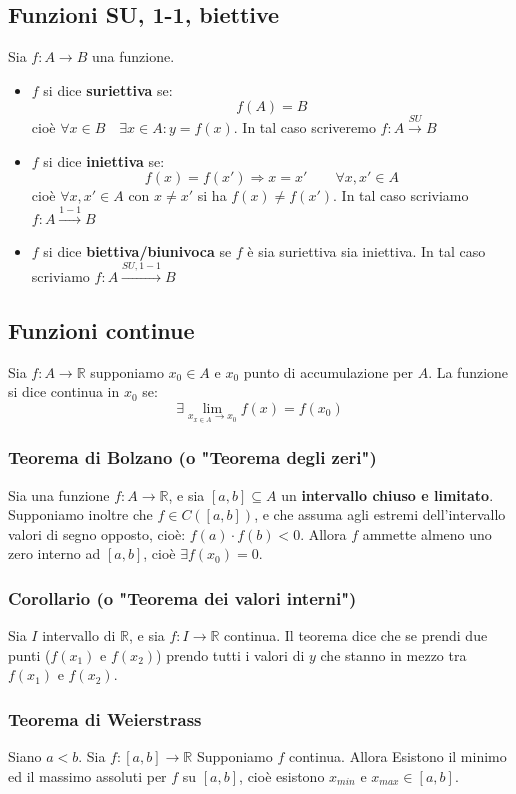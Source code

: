 \subsection{Funzioni SU, 1-1, biettive}
Sia $f:A\to B$ una funzione.
\begin{itemize}
    \item $f$ si dice \textbf{suriettiva} se:
    \begin{equation}
        f(A) = B
    \end{equation}
    cioè $\forall x\in B \quad \exists x\in A : y = f(x)$. In tal caso scriveremo $f:A\xrightarrow{SU} B$

    \item $f$ si dice \textbf{iniettiva} se:
    \begin{equation}
        f(x) = f(x') \Longrightarrow x = x' \qquad \forall x, x' \in A
    \end{equation}
    cioè $\forall x, x' \in A$ con $x \not = x'$ si ha $f(x) \not = f(x')$. In tal caso scriviamo $f:A\xrightarrow{1-1}B$

    \item $f$ si dice \textbf{biettiva/biunivoca} se $f$ è sia suriettiva sia iniettiva. In tal caso scriviamo $f:A\xrightarrow{SU, 1-1}B$
\end{itemize}

\subsection{Funzioni continue}
Sia $f:A\to\mathbb{R}$ supponiamo $x_0\in A$ e $x_0$ punto di accumulazione per $A$.
La funzione si dice continua in $x_0$ se:
\begin{equation}
    \exists\lim_{x_{x\in A}\to x_0}f(x) = f(x_0)
\end{equation}
\subsubsection{Teorema di Bolzano (o "Teorema degli zeri")}
Sia una funzione $f:A\to\mathbb{R}$, e sia $[a,b]\subseteq A$ un \textbf{intervallo chiuso e limitato}. Supponiamo inoltre che $f \in C([a, b])$, e che assuma agli estremi dell'intervallo valori di segno opposto, cioè: $f(a)\cdot f(b) < 0$.
Allora $f$ ammette almeno uno zero interno ad $[a, b]$, cioè $\exists f(x_0) = 0$.
\subsubsection{Corollario (o "Teorema dei valori interni")}
Sia $I$ intervallo di $\mathbb{R}$, e sia $f:I\to\mathbb{R}$ continua. Il teorema dice che se prendi due punti ($f(x_1)$ e $f(x_2)$) prendo tutti i valori di $y$ che stanno in mezzo tra $f(x_1)$ e $f(x_2)$.
\subsubsection{Teorema di Weierstrass}
Siano $a<b$. Sia $f:[a, b] \to \mathbb{R}$
Supponiamo $f$ continua. Allora Esistono il minimo ed il massimo assoluti per $f$ su $[a, b]$, cioè esistono $x_{min} \text{ e } x_{max} \in [a, b]$.